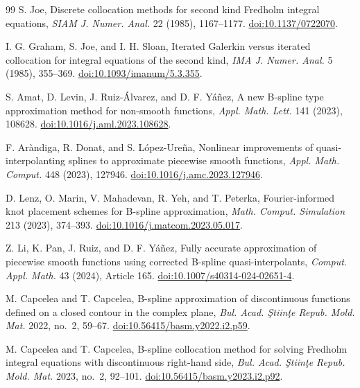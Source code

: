 \documentclass[11pt,a4paper]{amsart}
\theoremstyle{plain}
\theoremstyle{definition}
\theoremstyle{remark}
\begin{document}
\begin{thebibliography}{99}
S. Joe,
Discrete collocation methods for second kind Fredholm integral equations,
\emph{SIAM J. Numer. Anal.} 22 (1985), 1167--1177.
\href{https://doi.org/10.1137/0722070}{doi:10.1137/0722070}.

I. G. Graham, S. Joe, and I. H. Sloan,
Iterated Galerkin versus iterated collocation for integral equations of the second kind,
\emph{IMA J. Numer. Anal.} 5 (1985), 355--369.
\href{https://doi.org/10.1093/imanum/5.3.355}{doi:10.1093/imanum/5.3.355}.

S. Amat, D. Levin, J. Ruiz-\'Alvarez, and D. F. Y\'a\~nez,
A new B-spline type approximation method for non-smooth functions,
\emph{Appl. Math. Lett.} 141 (2023), 108628.
\href{https://doi.org/10.1016/j.aml.2023.108628}{doi:10.1016/j.aml.2023.108628}.

F. Ar\`andiga, R. Donat, and S. L\'opez-Ure\~na,
Nonlinear improvements of quasi-interpolanting splines to approximate piecewise smooth functions,
\emph{Appl. Math. Comput.} 448 (2023), 127946.
\href{https://doi.org/10.1016/j.amc.2023.127946}{doi:10.1016/j.amc.2023.127946}.

D. Lenz, O. Marin, V. Mahadevan, R. Yeh, and T. Peterka,
Fourier-informed knot placement schemes for B-spline approximation,
\emph{Math. Comput. Simulation} 213 (2023), 374--393.
\href{https://doi.org/10.1016/j.matcom.2023.05.017}{doi:10.1016/j.matcom.2023.05.017}.

Z. Li, K. Pan, J. Ruiz, and D. F. Y\'a\~nez,
Fully accurate approximation of piecewise smooth functions using corrected B-spline quasi-interpolants,
\emph{Comput. Appl. Math.} 43 (2024), Article 165.
\href{https://doi.org/10.1007/s40314-024-02651-4}{doi:10.1007/s40314-024-02651-4}.

M. Capcelea and T. Capcelea,
B-spline approximation of discontinuous functions defined on a closed contour in the complex plane,
\emph{Bul. Acad. \c{S}tiin\c{t}e Repub. Mold. Mat.} 2022, no.~2, 59--67.
\href{https://doi.org/10.56415/basm.y2022.i2.p59}{doi:10.56415/basm.y2022.i2.p59}.

M. Capcelea and T. Capcelea,
B-spline collocation method for solving Fredholm integral equations with discontinuous right-hand side,
\emph{Bul. Acad. \c{S}tiin\c{t}e Repub. Mold. Mat.} 2023, no.~2, 92--101.
\href{https://doi.org/10.56415/basm.y2023.i2.p92}{doi:10.56415/basm.y2023.i2.p92}.


\end{thebibliography}
\end{document}
